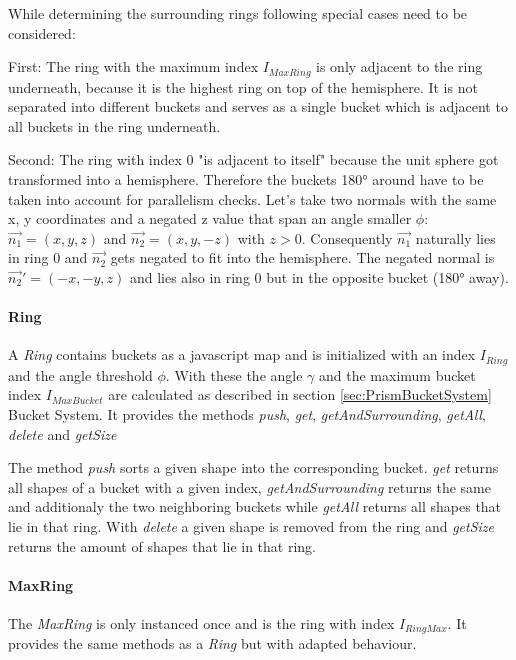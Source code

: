 \documentclass[../ClassicThesis.tex]{subfiles}
\begin{document}
While determining the surrounding rings following special cases need to be considered:

First: The ring with the maximum index $I_{MaxRing}$ is only adjacent to the ring underneath, because it is the highest ring on top of the hemisphere. It is not separated into different buckets and serves as a single bucket which is adjacent to all buckets in the ring underneath.

Second: The ring with index 0 "is adjacent to itself" because the unit sphere got transformed into a hemisphere. Therefore the buckets 180° around have to be taken into account for parallelism checks. Let's take two normals with the same x, y coordinates and a negated z value that span an angle smaller $ \phi $: $\vec{n_{1}} = (x, y, z)$ and $\vec{n_{2}} = (x, y, -z)$ with $z > 0$. Consequently $\vec{n_{1}}$ naturally lies in ring 0 and $\vec{n_{2}}$ gets negated to fit into the hemisphere. The negated normal is $\vec{n_{2}}' = (-x, -y, z) $ and lies also in ring 0 but in the opposite bucket (180° away).


\paragraph{Ring}

A \emph{Ring} contains buckets as a javascript map and is initialized with an index $ I_{Ring} $ and the angle threshold $ \phi$. With these the angle $ \gamma $ and the maximum bucket index $ I_{MaxBucket} $ are calculated as described in section \ref{sec:PrismBucketSystem} Bucket System. It provides the methods \emph{push}, \emph{get}, \emph{getAndSurrounding}, \emph{getAll}, \emph{delete} and \emph{getSize}

The method \emph{push} sorts a given shape into the corresponding bucket. \emph{get} returns all shapes of a bucket with a given index, \emph{getAndSurrounding} returns the same and additionaly the two neighboring buckets while \emph{getAll} returns all shapes that lie in that ring. With \emph{delete} a given shape is removed from the ring and \emph{getSize} returns the amount of shapes that lie in that ring.


\paragraph{MaxRing} The \emph{MaxRing} is only instanced once and is the ring with index $ I_{RingMax} $. It provides the same methods as a \emph{Ring} but with adapted behaviour.
\end{document}
